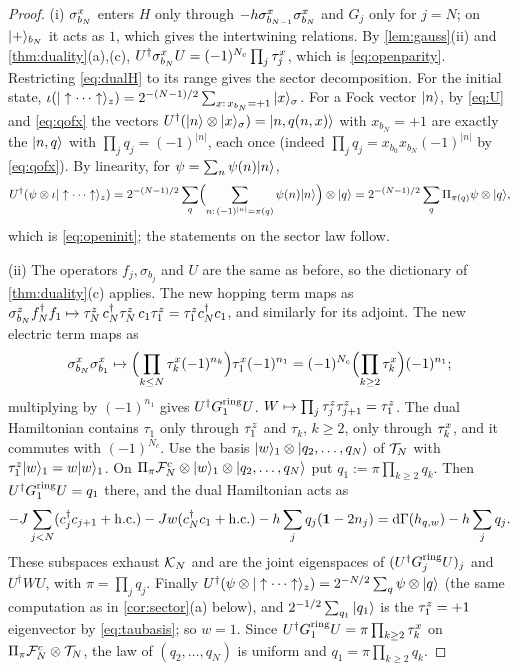 \begin{proof}
(i) $\sigma^{x}_{b_{N}}$ enters $H$ only through $-h\sigma^{x}_{b_{N-1}}\sigma^{x}_{b_{N}}$ and $G_j$ only for $j=N$; on
$|+\rangle_{b_N}$ it acts as $1$, which gives the intertwining relations.  By
\cref{lem:gauss}(ii) and \cref{thm:duality}(a),(c),
$U^\dagger\sigma^{x}_{b_{N}}U=(-1)^{N_c}\prod_j\tau^{x}_{j}$, which is \eqref{eq:openparity}.  Restricting
\eqref{eq:dualH} to its range gives the sector decomposition.  For the initial state,
$\iota(|\uparrow\cdots\uparrow\rangle_z)=2^{-(N-1)/2}\sum_{x:\,x_{b_N}=+1}|x\rangle_\sigma$.  For a Fock
vector $|n\rangle$, by \eqref{eq:U} and \eqref{eq:qofx} the vectors $U^\dagger(|n\rangle\otimes|x\rangle_\sigma)=|n,q(n,x)\rangle$
with $x_{b_N}=+1$ are exactly the $|n,q\rangle$ with $\prod_jq_j=(-1)^{|n|}$, each once (indeed
$\prod_jq_j=x_{b_0}x_{b_N}(-1)^{|n|}$ by \eqref{eq:qofx}).  By linearity, for $\psi=\sum_n\psi(n)|n\rangle$,
\[
  U^\dagger(\psi\otimes\iota|\uparrow\cdots\uparrow\rangle_z)
  =2^{-(N-1)/2}\sum_q\Bigl(\sum_{n:\,(-1)^{|n|}=\pi(q)}\psi(n)|n\rangle\Bigr)\otimes|q\rangle
  =2^{-(N-1)/2}\sum_q\Pi_{\pi(q)}\psi\otimes|q\rangle,
\]
which is \eqref{eq:openinit}; the statements on the sector law follow.

(ii) The operators $f_j,\sigma_{b_j}$ and $U$ are the same as before, so the dictionary of
\cref{thm:duality}(c) applies.  The new hopping term maps as
$\sigma^{z}_{b_{N}}f_N^\dagger f_1\mapsto\tau^{z}_{N}\,c_N^\dagger\tau^{z}_{N}\,c_1\tau^{z}_{1}=\tau^{z}_{1}c_N^\dagger c_1$, and similarly
for its adjoint.  The new electric term maps as
\[
  \sigma^{x}_{b_{N}}\sigma^{x}_{b_{1}}\mapsto\Bigl(\prod_{k\le N}\tau^{x}_{k}(-1)^{n_k}\Bigr)\tau^{x}_{1}(-1)^{n_1}
  =(-1)^{N_c}\Bigl(\prod_{k\ge2}\tau^{x}_{k}\Bigr)(-1)^{n_1};
\]
multiplying by $(-1)^{n_1}$ gives $U^\dagger G^{\rm ring}_1U$.  $W\mapsto\prod_j\tau^{z}_{j}\tau^{z}_{j+1}=\tau^{z}_{1}$.  The dual Hamiltonian
contains $\tau_1$ only through $\tau^{z}_{1}$ and $\tau_k$, $k\ge2$, only through $\tau^{x}_{k}$, and it
commutes with $(-1)^{N_c}$.  Use the basis $|w\rangle_1\otimes|q_2,\dots,q_N\rangle$ of $\mathcal{T}_N$ with
$\tau^{z}_{1}|w\rangle_1=w|w\rangle_1$.  On $\Pi_\pi\mathcal{F}_N^c\otimes|w\rangle_1\otimes|q_2,\dots,q_N\rangle$ put
$q_1:=\pi\prod_{k\ge2}q_k$.  Then $U^\dagger G^{\rm ring}_1U=q_1$ there, and the dual Hamiltonian acts as
\[
  -J\sum_{j<N}(c_j^\dagger c_{j+1}+{\rm h.c.})-Jw(c_N^\dagger c_1+{\rm h.c.})-h\sum_jq_j(\mathbf{1}-2n_j)
  =\mathrm{d}\Gamma(h_{q,w})-h\sum_jq_j .
\]  These subspaces exhaust $\mathcal{K}_N$ and are the joint eigenspaces of
$(U^\dagger G_j^{\rm ring}U)_j$ and $U^\dagger WU$, with $\pi=\prod_jq_j$.  Finally
$U^\dagger(\psi\otimes|\uparrow\cdots\uparrow\rangle_z)=2^{-N/2}\sum_q\psi\otimes|q\rangle$ (the same
computation as in \cref{cor:sector}(a) below), and
$2^{-1/2}\sum_{q_1}|q_1\rangle$ is the $\tau^{z}_{1}=+1$ eigenvector by \eqref{eq:taubasis}; so $w=1$.  Since
$U^\dagger G_1^{\rm ring}U=\pi\prod_{k\ge2}\tau^{x}_{k}$ on $\Pi_\pi\mathcal{F}^c_N\otimes\mathcal{T}_N$, the law of
$(q_2,\dots,q_N)$ is uniform and $q_1=\pi\prod_{k\ge2}q_k$.
\end{proof}

